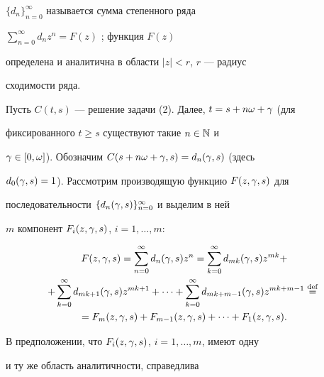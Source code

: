$\{d_n\}_{n=0}^\infty$ называется сумма степенного ряда


$\sum\limits_{n=0}^\infty d_nz^n=F(z)$ \cite{ME}; функция $F(z)$


определена и аналитична в области $|z|<r$, $r$ --- радиус


сходимости ряда.





Пусть $C(t,s)$ --- решение задачи (2). Далее, $t=s+n\omega+\gamma$ (для


фиксированного $t\ge s$ существуют такие $n\in \Bbb{N}$ и


$\gamma\in[0,\omega]$). Обозначим $C(s+n\omega+\gamma,s)=d_n(\gamma,s)$ (здесь


$d_0(\gamma,s)=1$). Рассмотрим производящую функцию $F(z,\gamma,s)$ для


последовательности $\{d_n(\gamma,s)\}_{n=0}^\infty$ и выделим в ней


$m$ компонент $F_i(z,\gamma,s)$, $i=1,\dotsc,m$:


\begin{gather*}


F(z,\g,s)=\sum_{n=0}^\infty d_n(\g,s)z^n=


\sum_{k=0}^\infty d_{mk}(\g,s)z^{mk}+\\


+\sum_{k=0}^\infty d_{mk+1}(\g,s)z^{mk+1}+\dotsb+


\sum_{k=0}^\infty d_{mk+m-1}(\g,s)z^{mk+m-1}\df\\


=F_m(z,\g,s)+F_{m-1}(z,\g,s)+\dotsb+F_{1}(z,\g,s).


\end{gather*}


В предположении, что $F_{i}(z,\gamma,s)$, $i=1,\dotsc,m$, имеют одну


и ту же область аналитичности, справедлива





